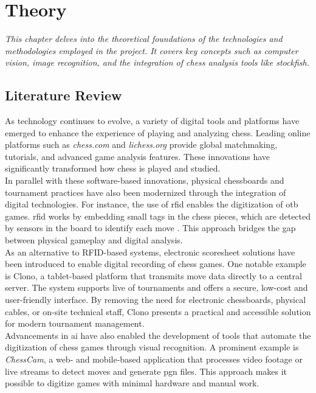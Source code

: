 \chapter{Theory}
\label{chp:theory}

\begin{center}
    \textit{This chapter delves into the theoretical foundations of the technologies and methodologies employed in the project. It covers key concepts such as computer vision, image recognition, and the integration of chess analysis tools like \Gls{stockfish}.}    
\end{center}

\section{Literature Review}
\label{sec:literature-review}

As technology continues to evolve, a variety of digital tools and platforms have emerged to enhance the experience of playing and analyzing chess. Leading online platforms such as \textit{chess.com} and \textit{lichess.org} provide global matchmaking, tutorials, and advanced game analysis features. These innovations have significantly transformed how chess is played and studied. \\

In parallel with these software-based innovations, physical chessboards and tournament practices have also been modernized through the integration of digital technologies. For instance, the use of \gls{rfid} enables the digitization of \gls{otb} games. \gls{rfid} works by embedding small tags in the chess pieces, which are detected by sensors in the board to identify each move \cite{quora:shah}. This approach bridges the gap between physical gameplay and digital analysis. \\

As an alternative to RFID-based systems, electronic scoresheet solutions have been introduced to enable digital recording of chess games. One notable example is Clono, a tablet-based platform that transmits move data directly to a central server. The system supports live of tournaments and offers a secure, low-cost and user-friendly interface. By removing the need for electronic chessboards, physical cables, or on-site technical staff, Clono presents a practical and accessible solution for modern tournament management. \cite{clono} \\

Advancements in \gls{ai} have also enabled the development of tools that automate the digitization of chess games through visual recognition. A prominent example is \textit{ChessCam}, a web- and mobile-based application that processes video footage or live streams to detect moves and generate \gls{pgn} files. This approach makes it possible to digitize games with minimal hardware and manual work. \cite{github:chesscam, lichess:chesscam}

